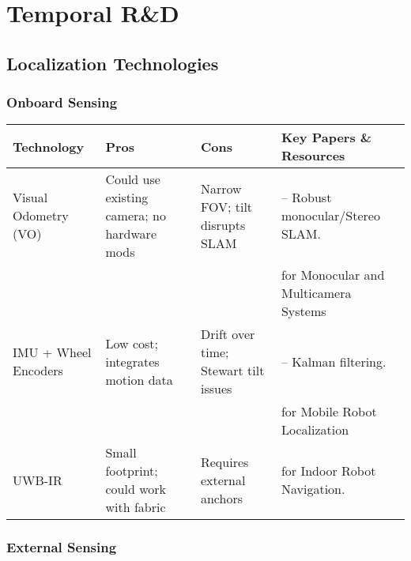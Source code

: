 \chapter{Temporal R\&D}
\label{ch:chapter_one}

\section*{Localization Technologies}

\subsection*{Onboard Sensing}
\begin{table}[H]
    \centering
    \begin{tabular}{|>{\raggedright\arraybackslash}p{3cm}|>{\raggedright\arraybackslash}p{3cm}|>{\raggedright\arraybackslash}p{3cm}|>{\raggedright\arraybackslash}p{5cm}|}
        \hline
        \textbf{Technology} & \textbf{Pros} & \textbf{Cons} & \textbf{Key Papers \& Resources} \\ \hline

        Visual Odometry (VO) & Could use existing camera; no hardware mods& Narrow FOV; tilt disrupts SLAM & \cite{campos2021orbslam3} – Robust monocular/Stereo SLAM. \\ 
         & & & \cite{forster2016svo} for Monocular and Multicamera Systems \\ \hline
  
        IMU + Wheel Encoders & Low cost; integrates motion data & Drift over time; Stewart tilt issues & \cite{huang2018sensor} – Kalman filtering. \\ 
         & & & \cite{ekf2021practice} for Mobile Robot Localization \\ \hline
         
        UWB-IR & Small footprint; could work with fabric & Requires external anchors & \cite{uwb2007localization} for Indoor Robot Navigation. \\ \hline
    \end{tabular}
\end{table}



 
\subsection*{External Sensing}
\FloatBarrier


